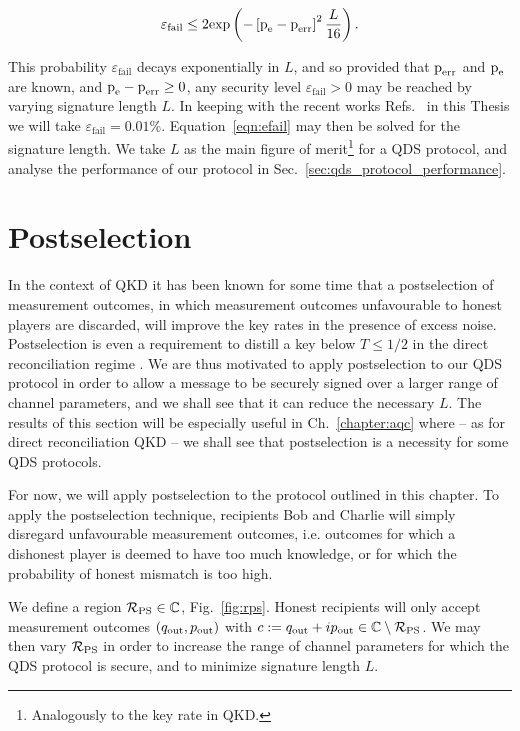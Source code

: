 \begin{equation}\label{eqn:efail}
\varepsilon_{\text{fail}} \le 2 \text{exp}\left( - \left[\text{p}_{\text{e}} - \text{p}_{\text{err}}\right]^2 \frac{L}{16}\right).
\end{equation}

\noindent This probability $\varepsilon_{\text{fail}}$ decays exponentially in $L$, and so provided that $\text{p}_{\text{err}}$ and $\text{p}_{\text{e}}$ are known, and $\text{p}_{\text{e}} - \text{p}_{\text{err}} \ge 0$, any security level $\varepsilon_{\text{fail}} > 0 $ may be reached by varying signature length $L$. In keeping with the recent works Refs.~\cite{Collins2014, Croal2016, Donaldson2016, Amiri2016} in this Thesis we will take $\varepsilon_{\text{fail}} = 0.01\%$. Equation~\ref{eqn:efail} may then be solved for the signature length. We take $L$ as the main figure of merit\footnote{Analogously to the key rate in QKD.} for a QDS protocol, and analyse the performance of our protocol in Sec.~\ref{sec:qds_protocol_performance}.



\section{Postselection}\label{sec:qds_postselection}
In the context of QKD it has been known for some time that a postselection of measurement outcomes, in which measurement outcomes unfavourable to honest players are discarded, will improve the key rates in the presence of excess noise. Postselection is even a requirement to distill a key below $T \le 1/2$ in the direct reconciliation regime \cite{Silberhorn2002}. We are thus motivated to apply postselection to our QDS protocol in order to allow a message to be securely signed over a larger range of channel parameters, and we shall see that it can reduce the necessary $L$. The results of this section will be especially useful in Ch.~\ref{chapter:aqc} where -- as for direct reconciliation QKD -- we shall see that postselection is a necessity for some QDS protocols.

For now, we will apply postselection to the protocol outlined in this chapter. To apply the postselection technique, recipients Bob and Charlie will simply disregard unfavourable measurement outcomes, i.e. outcomes for which a dishonest player is deemed to have too much knowledge, or for which the probability of honest mismatch is too high.

We define a region $\mathcal{R}_{\text{PS}} \in \mathbb{C}$, Fig.~\ref{fig:rps}. Honest recipients will only accept measurement outcomes $\left(q_{\text{out}}, p_{\text{out}}\right)$ with $c := q_{\text{out}} + i p_{\text{out}} \in \mathbb{C}\setminus\mathcal{R}_{\text{PS}}$. We may then vary $\mathcal{R}_{\text{PS}}$ in order to increase the range of channel parameters for which the QDS protocol is secure, and to minimize signature length $L$.

